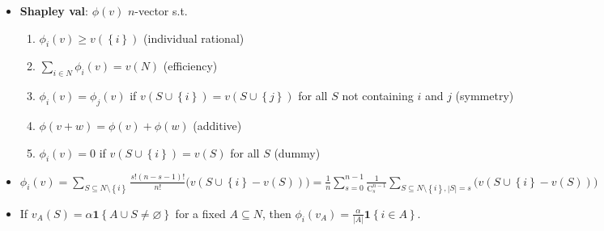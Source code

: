 \documentclass[8pt]{article}
\newcommand{\abs}[1]{\left\lvert#1\right\rvert}
\begin{document}
\begin{multicols*}{3}
\begin{itemize}
\begin{enumerate}
            \end{enumerate}
            \item \textbf{Shapley val}: $\phi\left(v\right)$ $n$-vector s.t. 
            \begin{enumerate}
                \setlength\itemsep{0pt}
                \item $\phi_i\left(v\right) \geq v\left(\left\{i\right\}\right)$ (individual rational)
                \item $\sum_{i \in N}\phi_i\left(v\right) = v\left(N\right)$ (efficiency)
                \item $\phi_i\left(v\right) = \phi_j\left(v\right)$ if $v\left(S \cup \left\{i\right\}\right) = v\left(S \cup \left\{j\right\}\right)$ for all $S$ not containing $i$ and $j$ (symmetry)
                \item $\phi\left(v + w\right) = \phi\left(v\right) + \phi\left(w\right)$ (additive)
                \item $\phi_i\left(v\right) = 0$ if $v\left(S \cup \left\{i\right\}\right) = v\left(S\right)$ for all $S$ (dummy)
            \end{enumerate}
            \item $\phi_i\left(v\right) = \sum_{S \subseteq N \setminus \left\{i\right\}}\frac{s!\left(n - s - 1\right)!}{n!}\bigl(v\left(S \cup \left\{i\right\} - v\left(S\right)\right)\bigr) = \frac{1}{n}\sum_{s = 0}^{n - 1}\frac{1}{\mathrm{C}^{n - 1}_s}\sum_{S \subseteq N \setminus \left\{i\right\}, \abs{S} = s}\bigl(v\left(S \cup \left\{i\right\} - v\left(S\right)\right)\bigr)$
            \item If $v_A\left(S\right) = \alpha\mathbf{1}\left\{A \cup S \neq \varnothing\right\}$ for a fixed $A \subseteq N$, then $\phi_i\left(v_A\right) = \frac{\alpha}{\abs{A}}\mathbf{1}\left\{i \in A\right\}$.
        \end{itemize}
    \end{multicols*}
\end{document}
